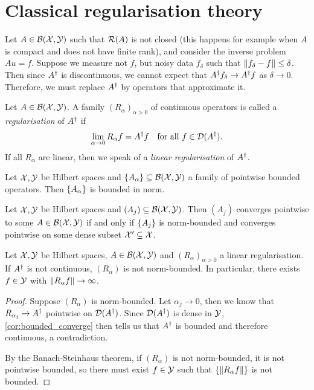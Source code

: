 \section{Classical regularisation theory}
Let $A \in \mathcal B(\mathcal X, \mathcal Y)$ such that $\operatorname{\mathcal R}(A)$ is not closed (this happens for example when $A$ is compact and does not have finite rank), and consider the inverse problem $Au = f$. Suppose we measure not $f$, but noisy data $f_\delta$ such that $\norm{f_\delta - f} \leq \delta$. Then since $A^\dagger$ is discontinuous, we cannot expect that $A^\dagger f_\delta \to A^\dagger f$ as $\delta \to 0$. Therefore, we must replace $A^\dagger$ by operators that approximate it.

\begin{definition}
	Let $A\in \mathcal B(\mathcal X, \mathcal Y)$. A family $(R_\alpha)_{\alpha > 0}$ of continuous operators is called a \emph{regularisation} of $A^\dagger$ if
	\[
	\lim_{\alpha \to 0} R_\alpha f = A^\dagger f \quad\text{for all $f \in \operatorname{\mathcal D}(A^\dagger)$}. 
	\]
	If all $R_\alpha$ are linear, then we speak of a \emph{linear regularisation} of $A^\dagger$. 
\end{definition}

\begin{theorem}
	Let $\mathcal X, \mathcal Y$ be Hilbert spaces and $\qty{A_\alpha} \subseteq \mathcal B(\mathcal X, \mathcal Y)$ a family of pointwise bounded operators. Then $\qty{A_\alpha}$ is bounded in norm. 
\end{theorem}

\begin{corollary} \label{cor:bounded_converge}
	Let $\mathcal X, \mathcal Y$ be Hilbert spaces and $(A_j) \subseteq \mathcal B(\mathcal X, \mathcal Y)$. Then $(A_j)$ converges pointwise to some $A \in \mathcal B(\mathcal X, \mathcal Y)$ if and only if $\qty{A_j}$ is norm-bounded and converges pointwise on some dense subset $\mathcal X' \subseteq \mathcal X$. 
\end{corollary}

\begin{theorem}
	Let $\mathcal X, \mathcal Y$ be Hilbert spaces, $A \in \mathcal B(\mathcal X, \mathcal Y)$ and $(R_\alpha)_{\alpha > 0}$ a linear regularisation. If $A^\dagger$ is not continuous, $(R_\alpha)$ is not norm-bounded. In particular, there exists $f \in \mathcal Y$ with $\norm{R_\alpha f} \to \infty$. 
\end{theorem}

\begin{proof}
	Suppose $(R_\alpha)$ is norm-bounded. Let $\alpha_j \to 0$, then we know that $R_{\alpha_j} \to A^\dagger$ pointwise on $\operatorname{\mathcal D}(A^\dagger)$. Since $\operatorname{\mathcal D}(A^\dagger)$ is dense in $\mathcal Y$, \cref{cor:bounded_converge} then  tells us that $A^\dagger$ is bounded and therefore continuous, a contradiction. 
	
	By the Banach-Steinhaus theorem, if $(R_\alpha)$ is not norm-bounded, it is not pointwise bounded, so there must exist $f \in \mathcal Y$ such that $\qty{\norm{R_\alpha f}}$ is not bounded. 
\end{proof}


